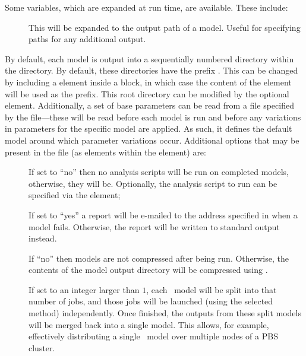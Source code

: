 Some variables, which are expanded at run time, are available. These include:
\begin{description}
\item [] This will be expanded to the output path of a model. Useful for specifying paths for any additional output.
\end{description}

By default, each model is output into a sequentially numbered directory within the  directory. By default, these directories have the prefix . This can be changed by including a  element inside a  block, in which case the content of the  element will be used as the prefix. This root directory can be modified by the optional  element. Additionally, a set of base parameters can be read from a file specified by the  file---these will be read before each model is run and before any variations in parameters for the specific model are applied. As such, it defines the default model around which parameter variations occur. Additional options that may be present in the file (as elements within the  element) are:
\begin{description}
\item[]If set to ``no'' then no analysis scripts will be run on completed models, otherwise, they will be. Optionally, the analysis script to run can be specified via the  element;
\item[] If set to ``yes'' a report will be e-mailed to the address specified in  when a model fails. Otherwise, the report will be written to standard output instead.
\item[] If ``no'' then models are not compressed after being run. Otherwise, the contents of the model output directory will be compressed using .
\item[] If set to an integer larger than $1$, each \glc\ model will be split into that number of jobs, and those jobs will be launched (using the selected method) independently. Once finished, the outputs from these split models will be merged back into a single model. This allows, for example, effectively distributing a single \glc\ model over multiple nodes of a PBS cluster.
\end{description}

